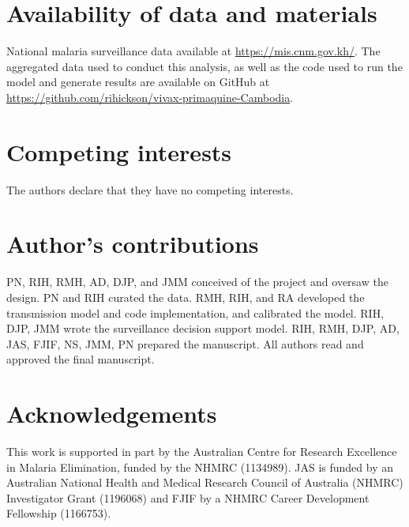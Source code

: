 \documentclass[doublespacing]{bmcart}
\begin{document}

\begin{backmatter}

\section*{Availability of data and materials}
National malaria surveillance data available at \url{https://mis.cnm.gov.kh/}. The aggregated data used to conduct this analysis, as well as the code used to run the model and generate results are available on GitHub at \url{https://github.com/rihickson/vivax-primaquine-Cambodia}. 

\section*{Competing interests}
  The authors declare that they have no competing interests.

\section*{Author's contributions}
    PN, RIH, RMH, AD, DJP, and JMM conceived of the project and oversaw the design. PN and RIH curated the data. RMH, RIH, and RA developed the transmission model and code implementation, and calibrated the model. RIH, DJP, JMM wrote the surveillance decision support model. RIH, RMH, DJP, AD, JAS, FJIF, NS, JMM, PN prepared the manuscript. All authors read and approved the final manuscript.

\section*{Acknowledgements}
This work is supported in part by the Australian Centre for Research Excellence in Malaria Elimination, funded by the NHMRC (1134989). JAS is funded by an Australian National Health and Medical Research Council of Australia (NHMRC) Investigator Grant (1196068) and FJIF by a NHMRC Career Development Fellowship (1166753).



\end{backmatter}
\end{document}
